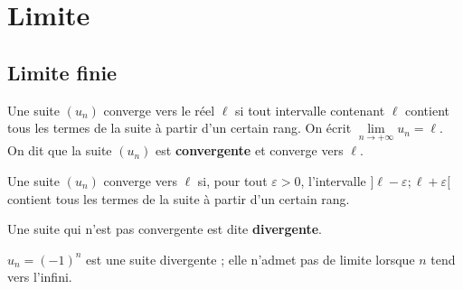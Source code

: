\documentclass[11pt,a4paper,openany]{book}
\theoremstyle{definition}
\begin{document}
    \section{Limite}
    \subsection{Limite finie}
    \begin{Définition}
    Une suite $(u_n)$ converge vers le réel $\ell$ si tout intervalle contenant $\ell$
    contient tous les termes de la suite à partir d'un certain rang.
    On écrit $\lim\limits_{n\to+\infty}u_n=\ell$.
    On dit que la suite $(u_n)$ est \textbf{convergente} et converge vers $\ell$.
    \end{Définition}

    \begin{Remarque}
    Une suite $(u_n)$ converge vers $\ell$ si, pour tout $\varepsilon>0$, l'intervalle
    $]\ell-\varepsilon;\ell+\varepsilon[$ contient tous les termes de la suite à partir
    d'un certain rang.
    \end{Remarque}

    \begin{center}
    \end{center}

    \begin{Définition}
    Une suite qui n'est pas convergente est dite \textbf{divergente}.
    \end{Définition}

    \begin{Exemple}
    $u_n=(-1)^n$ est une suite divergente ; elle n'admet pas de limite lorsque $n$ tend
    vers l'infini.
    \end{Exemple}

    \begin{center}
    \end{center}
\end{document}
